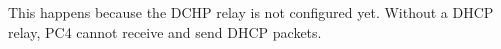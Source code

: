 This happens because the DCHP relay is not configured yet. Without a DHCP relay, PC4 cannot receive and send DHCP packets.
